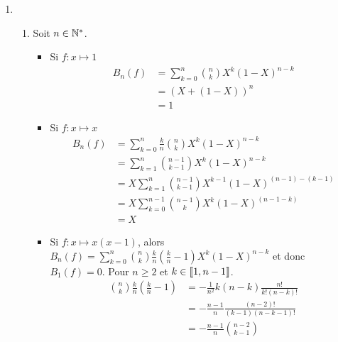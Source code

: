 \begin{enumerate}
    \item
        \begin{enumerate}
            \item Soit $n\in \mathbb{N}^*$.
                \begin{itemize}
                    \item Si $f : x\mapsto 1$
                    \[
                        \begin{aligned}
                            B_n(f) &= \sum\limits_{k=0}^n\binom{n}{k}X^k(1-X)^{n-k}\\
                            &= (X+(1-X))^n\\
                            &= 1
                        \end{aligned}                                            
                    \]
                    \item Si $f : x\mapsto x$
                    \[
                        \begin{aligned}
                            B_n(f) &= \sum\limits_{k=0}^n\frac{k}{n}\binom{n}{k}X^k(1-X)^{n-k}\\
                            &= \sum\limits_{k=1}^n\binom{n-1}{k-1}X^k(1-X)^{n-k}\\
                            &= X \sum\limits_{k=1}^n\binom{n-1}{k-1}X^{k-1}(1-X)^{(n-1)-(k-1)}\\
                            &= X \sum\limits_{k=0}^{n-1}\binom{n-1}{k}X^{k}(1-X)^{(n-1-k)}\\
                            &= X
                        \end{aligned}                                            
                    \]
                    \item Si $f : x \mapsto x(x-1)$, alors $B_n(f) = \sum\limits_{k=0}^n\binom{n}{k}\frac{k}{n}\left(\frac{k}{n}-1\right) X^k(1-X)^{n-k}$ et donc $B_1(f)=0$. Pour $n \geqslant 2$ et $k\in\left\llbracket 1, n-1 \right\rrbracket$.
                        \[
                            \begin{aligned}
                                \binom{n}{k}\frac{k}{n}\left(\frac{k}{n}-1\right) &= - \frac{1}{n^2}k(n-k)\frac{n!}{k!(n-k)!}\\
                                &= -\frac{n-1}{n} \frac{(n-2)!}{(k-1)(n-k-1)!}\\
                                &= - \frac{n-1}{n} \binom{n-2}{k-1}
                            \end{aligned}
\]
\end{itemize}
\end{enumerate}
\end{enumerate}
